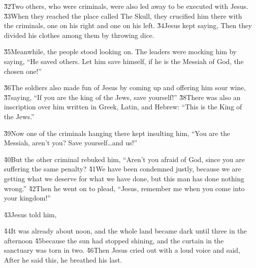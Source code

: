 \v{32}Two others, who were criminals, were also led away to be executed with Jesus. \v{33}When they reached the place called The Skull, they crucified him there with the criminals, one on his right and one on his left. \v{34}Jesus kept saying,  Then they divided his clothes among them by throwing dice.

\v{35}Meanwhile, the people stood looking on. The leaders were mocking him by saying, ``He saved others. Let him save himself, if he is the Messiah of God, the chosen one!''

\v{36}The soldiers also made fun of Jesus by coming up and offering him sour wine, \v{37}saying, ``If you are the king of the Jews, save yourself!'' \v{38}There was also an inscription over him written in Greek, Latin, and Hebrew: ``This is the King of the Jews.''

\v{39}Now one of the criminals hanging there kept insulting him, ``You are the Messiah, aren't you? Save yourself{\ldots}and us!''

\v{40}But the other criminal rebuked him, ``Aren't you afraid of God, since you are suffering the same penalty? \v{41}We have been condemned justly, because we are getting what we deserve for what we have done, but this man has done nothing wrong.'' \v{42}Then he went on to plead, ``Jesus, remember me when you come into your kingdom!''

\v{43}Jesus told him, 

\v{44}It was already about noon, and the whole land became dark until three in the afternoon \v{45}because the sun had stopped shining, and the curtain in the sanctuary was torn in two. \v{46}Then Jesus cried out with a loud voice and said,  After he said this, he breathed his last.

